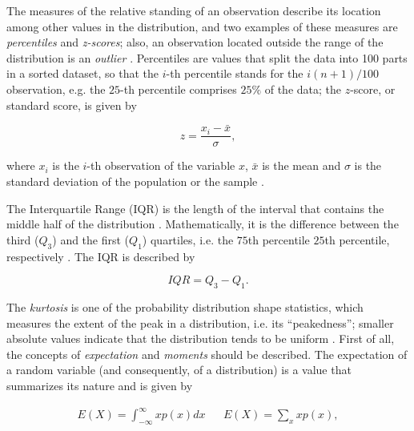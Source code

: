 
The measures of the relative standing of an observation describe its location among other values in the distribution, and two examples of these measures are \emph{percentiles} and \emph{z-scores}; also, an observation located outside the range of the distribution is an \emph{outlier} \cite{mendenhall2016statistics}. Percentiles are values that split the data into 100 parts in a sorted dataset, so that the $i$-th percentile stands for the $i(n + 1) / 100$ observation, e.g. the $25$-th percentile comprises $25\%$ of the data; the $z$-score, or standard score, is given by

\begin{equation}
\label{eqn:z_score}
z = \frac{x_{i} - \bar{x}}{\sigma},
\end{equation}

\noindent where $x_{i}$ is the $i$-th observation of the variable $x$, $\bar{x}$ is the mean and $\sigma$ is the standard deviation of the population or the sample \cite{zwillinger1999crc}. 

The Interquartile Range (IQR) is the length of the interval that contains the middle half of the distribution \cite{degroot2012probability}. Mathematically, it is the difference between the third ($Q_{3}$) and the first ($Q_{1}$) quartiles, i.e. the $75$th percentile $25$th percentile, respectively \cite{devore2011probability}. The IQR is described by

\begin{equation}
\label{eqn:iqr}
IQR = Q_{3} - Q_{1}.
\end{equation}

The \emph{kurtosis} is one of the probability distribution shape statistics, which measures the extent of the peak in a distribution, i.e. its ``peakedness''; smaller absolute values indicate that the distribution tends to be uniform \cite{zwillinger1999crc}. First of all, the concepts of \emph{expectation} and \emph{moments} should be described. The expectation of a random variable (and consequently, of a distribution) is a value that summarizes its nature and is given by

\begin{align}
\label{eqn:expectation}
E(X) = \int_{-\infty}^{\infty} x p(x)dx
&&
E(X) = \sum_{x} x p(x),
\end{align}

